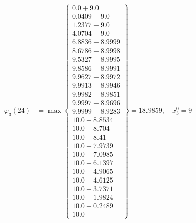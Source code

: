 \documentclass{article}
\begin{document}
\begin{align*}
\varphi_{3}(24) &= \max \left\{ \begin{array}{c}
0.0 + 9.0 \\
 0.0409 + 9.0 \\
 1.2377 + 9.0 \\
 4.0704 + 9.0 \\
 6.8836 + 8.9999 \\
 8.6786 + 8.9998 \\
 9.5327 + 8.9995 \\
 9.8586 + 8.9991 \\
 9.9627 + 8.9972 \\
 9.9913 + 8.9946 \\
 9.9982 + 8.9851 \\
 9.9997 + 8.9696 \\
 9.9999 + 8.9283 \\
 10.0 + 8.8534 \\
 10.0 + 8.704 \\
 10.0 + 8.41 \\
 10.0 + 7.9739 \\
 10.0 + 7.0985 \\
 10.0 + 6.1397 \\
 10.0 + 4.9065 \\
 10.0 + 4.6125 \\
 10.0 + 3.7371 \\
 10.0 + 1.9824 \\
 10.0 + 0.2489 \\
 10.0
\end{array} \right\}=18.9859, \quad x_{3}^0=9\\
  

\end{align*}
\end{document}
